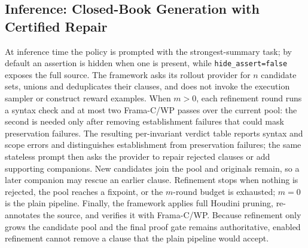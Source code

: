 \subsection{Inference: Closed-Book Generation with Certified Repair}
\label{sec:method:inference}

At inference time the policy is prompted with the strongest-summary task; by default an assertion is hidden when one is present, while \texttt{hide\_assert=false} exposes the full source.  The framework asks its rollout provider for $n$ candidate sets, unions and deduplicates their clauses, and does not invoke the execution sampler or construct reward examples.
When $m>0$, each refinement round runs a syntax check and at most two Frama-C/WP passes over the current pool: the second is needed only after removing establishment failures that could mask preservation failures.  The resulting per-invariant verdict table reports syntax and scope errors and distinguishes establishment from preservation failures; the same stateless prompt then asks the provider to repair rejected clauses or add supporting companions.  New candidates join the pool and originals remain, so a later companion may rescue an earlier clause.  Refinement stops when nothing is rejected, the pool reaches a fixpoint, or the $m$-round budget is exhausted; $m=0$ is the plain pipeline.
Finally, the framework applies full Houdini pruning, re-annotates the source, and verifies it with Frama-C/WP.  Because refinement only grows the candidate pool and the final proof gate remains authoritative, enabled refinement cannot remove a clause that the plain pipeline would accept.
